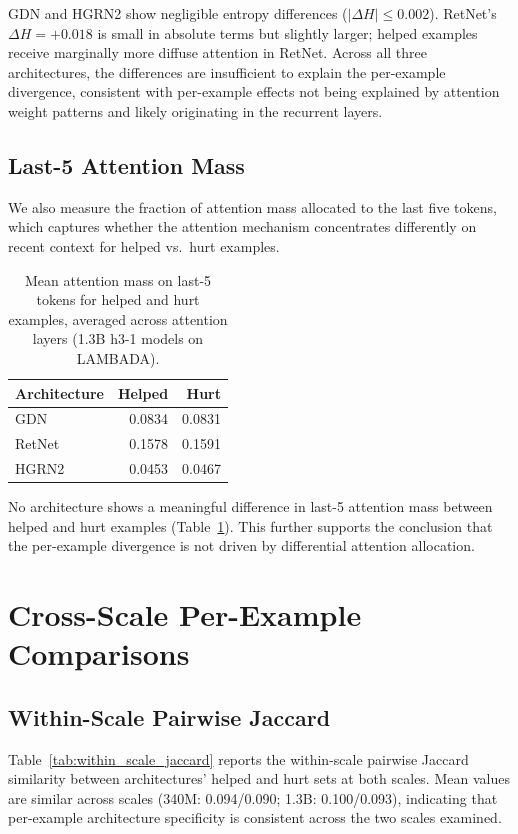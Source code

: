 GDN and HGRN2 show negligible entropy differences ($|\Delta H| \leq 0.002$). RetNet's $\Delta H = +0.018$ is small in absolute terms but slightly larger; helped examples receive marginally more diffuse attention in RetNet. Across all three architectures, the differences are insufficient to explain the per-example divergence, consistent with per-example effects not being explained by attention weight patterns and likely originating in the recurrent layers.

\subsection{Last-5 Attention Mass}

We also measure the fraction of attention mass allocated to the last five tokens, which captures whether the attention mechanism concentrates differently on recent context for helped vs.\ hurt examples.

\begin{table}[ht]
\centering
\caption{Mean attention mass on last-5 tokens for helped and hurt examples, averaged across attention layers (1.3B h3-1 models on LAMBADA).}
\label{tab:attn_last5}
\begin{tabular}{lrr}
\toprule
Architecture & Helped & Hurt \\
\midrule
GDN & 0.0834 & 0.0831 \\
RetNet & 0.1578 & 0.1591 \\
HGRN2 & 0.0453 & 0.0467 \\
\bottomrule
\end{tabular}
\end{table}

No architecture shows a meaningful difference in last-5 attention mass between helped and hurt examples (Table~\ref{tab:attn_last5}). This further supports the conclusion that the per-example divergence is not driven by differential attention allocation.

\section{Cross-Scale Per-Example Comparisons}\label{app:cross_scale}

\subsection{Within-Scale Pairwise Jaccard}

Table~\ref{tab:within_scale_jaccard} reports the within-scale pairwise Jaccard similarity between architectures' helped and hurt sets at both scales. Mean values are similar across scales (340M: 0.094/0.090; 1.3B: 0.100/0.093), indicating that per-example architecture specificity is consistent across the two scales examined.

